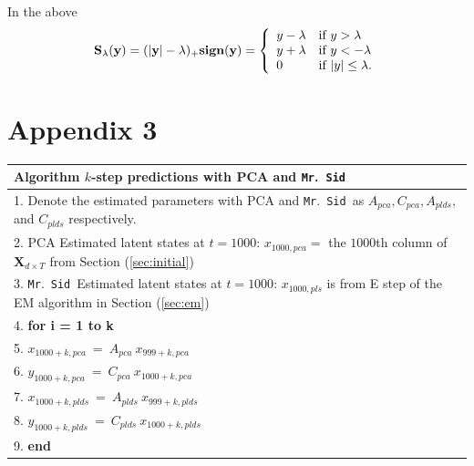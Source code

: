 \documentclass[fleqn]{article}
\let\oldref\ref
\renewcommand{\ref}[1]{(\oldref{#1})}
\newcommand{\mrsid}{{\sc \texttt{Mr}.~\texttt{Sid}}}
\providecommand{\mb}[1]{\boldsymbol{#1}}
\newcommand{\bX}{\mb{X}}
\begin{document}
\vspace*{10mm}
In the above
\[
\mathbf{S_\lambda (y) = (|y|-\lambda)_{+}\textbf{sign}(y)}=\left\{
\begin{array}{l l }
 y - \lambda & \text{if   } y > \lambda\\
 y + \lambda & \text{if   } y < -\lambda\\
 0 & \text{if   } |y| \leq \lambda .
\end{array}
\right.
\]

\section*{Appendix 3}
\label{sec:appendix3}
\begin{tabular}{l}
\hline
\textbf{Algorithm } $k$-step predictions with PCA and \mrsid\\
\hline
 1. Denote the estimated parameters with PCA and \mrsid~as $A_{pca},C_{pca},A_{plds},$ and $C_{plds}$ respectively.\\
 2. PCA Estimated latent states at $t=1000$: $x_{1000,pca} = $ the $1000$th column of $\bX_{d\times T}$ from Section \oldref{sec:initial} \\
 3. \mrsid~Estimated latent states at $t=1000$: $x_{1000,pls}$ is from E step of the EM algorithm in Section \oldref{sec:em}\\
 4. \textbf{for i = 1 to k}\\
 5. \hspace{10mm}		$x_{1000+k,pca}\ =\ A_{pca}\ x_{999+k,pca}$\\
 6.	\hspace{10mm}	$y_{1000+k,pca}\ =\ C_{pca}\ x_{1000+k,pca}$\\
 7.	\hspace{10mm}	$x_{1000+k,plds}\ =\ A_{plds}\ x_{999+k,plds}$\\
 8.	\hspace{10mm}	$y_{1000+k,plds}\ =\ C_{plds}\ x_{1000+k,plds}$\\
 9. \textbf{end}\\
\hline
\end{tabular}
\end{document}
